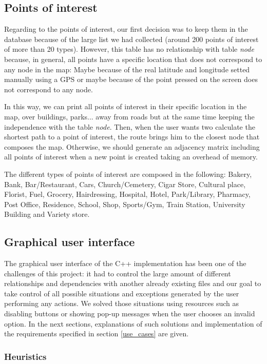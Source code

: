 \documentclass{article}
\begin{document}
\subsection{Points of interest}
Regarding to the points of interest, our first decision was to keep them in the database because of the large list we had collected (around 200 points of interest of more than 20 types). However, this table has no relationship with table \textit{node} because, in general, all points have a specific location that does not correspond to any node in the map: Maybe because of the real latitude and longitude setted manually using a GPS or maybe because of the point pressed on the screen does not correspond to any node.

In this way, we can print all points of interest in their specific location in the map, over buildings, parks... away from roads but at the same time keeping the independence with the table \textit{node}. Then, when the user wants two calculate the shortest path to a point of interest, the route brings him to the closest node that composes the map. Otherwise, we should generate an adjacency matrix including all points of interest when a new point is created taking an overhead of memory.

The different types of points of interest are composed in the following: Bakery, Bank, Bar/Restaurant, Cars, Church/Cemetery, Cigar Store, Cultural place, Florist, Fuel, Grocery, Hairdressing, Hospital, Hotel, Park/Library, Pharmacy, Post Office, Residence, School, Shop, Sports/Gym, Train Station, University Building and Variety store.

\subsection{Graphical user interface}
The graphical user interface of the C++ implementation has been one of the challenges of this project: it had to control the large amount of different relationships and dependencies with another already existing files and our goal to take control of all possible situations and exceptions generated by the user performing any actions. We solved those situations using resources such as disabling buttons or showing pop-up messages when the user chooses an invalid option. In the next sections, explanations of such solutions and implementation of the requirements specified in section \ref{use_cases} are given.

\subsubsection{Heuristics}
\end{document}
